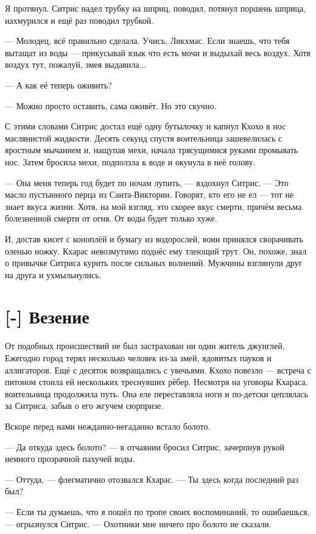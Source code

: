 Я протянул.
Ситрис надел трубку на шприц, поводил, потянул поршень шприца, нахмурился и ещё раз поводил трубкой.

--- Молодец, всё правильно сделала.
Учись, Ликхмас.
Если знаешь, что тебя вытащат из воды --- прикусывай язык что есть мочи и выдыхай весь воздух.
Хотя воздух тут, пожалуй, змея выдавила...

--- А как её теперь оживить?

--- Можно просто оставить, сама оживёт.
Но это скучно.

С этими словами Ситрис достал ещё одну бутылочку и капнул Кхохо в нос маслянистой жидкости.
Десять секунд спустя воительница зашевелилась с яростным мычанием и, нащупав мехи, начала трясущимися руками промывать нос.
Затем бросила мехи, подползла к воде и окунула в неё голову.

--- Она меня теперь год будет по ночам лупить, --- вздохнул Ситрис.
--- Это масло пустынного перца из Санта-Виктории.
Говорят, кто его не ел --- тот не знает вкуса жизни.
Хотя, на мой взгляд, это скорее вкус смерти, причём весьма болезненной смерти от огня.
От воды будет только хуже.

И, достав кисет с коноплёй и бумагу из водорослей, воин принялся сворачивать оленью ножку.
Кхарас невозмутимо поднёс ему тлеющий трут.
Он, похоже, знал о привычке Ситриса курить после сильных волнений.
Мужчины взглянули друг на друга и ухмыльнулись.

\section{[-] Везение}

От подобных происшествий не был застрахован ни один житель джунглей.
Ежегодно город терял несколько человек из-за змей, ядовитых пауков и аллигаторов.
Ещё с десяток возвращались с увечьями.
Кхохо повезло --- встреча с питоном стоила ей нескольких треснувших рёбер.
Несмотря на уговоры Кхараса, воительница продолжила путь.
Она еле переставляла ноги и по-детски цеплялась за Ситриса, забыв о его жгучем сюрпризе.

Вскоре перед нами нежданно-негаданно встало болото.

--- Да откуда здесь болото? --- в отчаянии бросил Ситрис, зачерпнув рукой немного прозрачной пахучей воды.

--- Оттуда, --- флегматично отозвался Кхарас.
--- Ты здесь когда последний раз был?

--- Если ты думаешь, что я пошёл по тропе своих воспоминаний, то ошибаешься, --- огрызнулся Ситрис.
--- Охотники мне ничего про болото не сказали.

